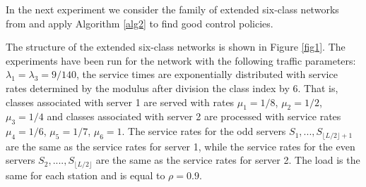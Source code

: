 \documentclass[11pt]{article}
\theoremstyle{definition}
\numberwithin{equation}{section}
\begin{document}
In the next experiment we consider the family of extended six-class networks from \cite{Bertsimas2015} and apply Algorithm \ref{alg2} to find good control policies.

 The structure  of the  extended six-class networks is shown in Figure \ref{fig1}.
The experiments have been run for the network with the following traffic parameters: $\lambda_1 = \lambda_3 = 9/140$, the service times are exponentially distributed with service rates determined  by the modulus after division the class index  by 6. That is, classes associated with server 1 are served with rates $\mu_1 = 1/8$, $\mu_2 = 1/2$, $\mu_3 = 1/4$ and classes associated with server 2 are processed with service rates $\mu_4 = 1/6$, $\mu_5 = 1/7$, $\mu_6 = 1.$  The service rates
for the odd servers $S_1, ..., S_{\lfloor L/2\rfloor+1}$ are the same as the service rates for server 1, while the service rates for the even
servers $S_2, ...., S_{\lfloor L/2 \rfloor}$ are the same as the service rates for server 2. The load is the same for each station and is equal to $\rho = 0.9$.
\end{document}
